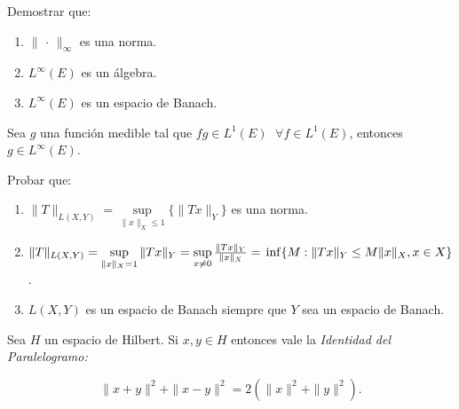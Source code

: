 \documentclass{book}
\newcommand{\rr}{\mathbb{R}}
\begin{document}
\begin{ejer}{} Demostrar que:
	\begin{enumerate}
\item $\|\, \cdot\,\|_{\infty}$ es una norma.
\item $L^{\infty}(E)$ es un álgebra.
\item $L^{\infty}(E)$ es un espacio de Banach.  
	\end{enumerate}
	\end{ejer}





\begin{ejer}{} Sea $g$ una función medible tal que $fg\in L^1(E)$ $\;\forall f \in L^1(E)$, entonces $g \in L^{\infty}(E)$.
\end{ejer}




\begin{ejer}{} Probar que: 
		\begin{enumerate}
	\item 
$\|T\|_{L(X,Y)}=\sup\limits_{\|x\|_{X}\leq 1}\{\|Tx\|_{Y}\}$
es una norma.
	\item 
 $\|T\|_{L(X,Y)}=\sup\limits_{\|x\|_{X}=1}\|Tx\|_{Y}=
\sup\limits_{x \not =0}\frac{\|Tx\|_{Y}}{\|x\|_{X}}=
\\
\inf\{M:\|Tx\|_{Y}\leq M \|x\|_{X}, x\in X\}$.
\item $L(X,Y)$ es un espacio de Banach siempre que $Y$ sea un espacio de Banach.
		\end{enumerate}
\end{ejer}
		
		
\begin{ejer}{} 
Sea $H$ un espacio de Hilbert. Si $x,y\in H$ entonces vale la {\it{Identidad del Paralelogramo:}}

 $$\|x+y\|^2+\|x-y\|^2=2(\|x\|^2+\|y\|^2). $$
 \end{ejer}
 
\end{document}

